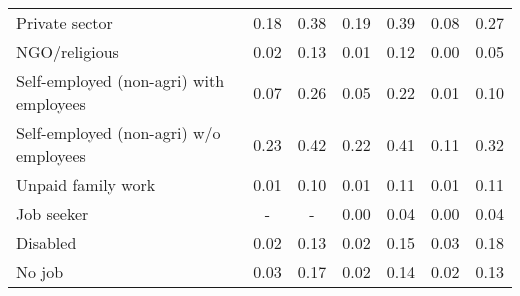 \begin{table}[htbp]
\begin{tabulary}{1 \textwidth}{Lcccccc}
     Private sector &                     0.18  &                     0.38  &                     0.19  &                     0.39  &                      0.08  &                 0.27  \\
     NGO/religious &                     0.02  &                     0.13  &                     0.01  &                     0.12  &                      0.00  &                 0.05  \\
     Self-employed (non-agri) with employees &                     0.07  &                     0.26  &                     0.05  &                     0.22  &                      0.01  &                 0.10  \\
     Self-employed (non-agri) w/o employees &                     0.23  &                     0.42  &                     0.22  &                     0.41  &                      0.11  &                 0.32  \\
     Unpaid family work &                     0.01  &                     0.10  &                     0.01  &                     0.11  &                      0.01  &                 0.11  \\
    Job seeker &                          -    &                          -    &                     0.00  &                     0.04  &                      0.00  &                 0.04  \\
     
     Disabled  &                     0.02  &                     0.13  &                     0.02  &                     0.15  &                      0.03  &                 0.18  \\
     No job &                     0.03  &                     0.17  &                     0.02  &                     0.14  &                      0.02  &                 0.13  \\
    \bottomrule
    \end{tabulary}%
    \label{tab:addlabel}%

\end{table}%
